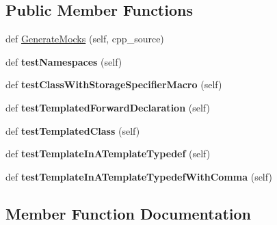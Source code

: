 \subsection*{Public Member Functions}
\begin{DoxyCompactItemize}
\item 
def \mbox{\hyperlink{classcpp_1_1gmock__class__test_1_1_generate_mocks_test_afdce6749dca14c1aa90762d389d92c87}{Generate\+Mocks}} (self, cpp\+\_\+source)
\item 
\mbox{\label{classcpp_1_1gmock__class__test_1_1_generate_mocks_test_a706812da9e8f79a689c707b4032db2d2}} 
def {\bfseries test\+Namespaces} (self)
\item 
\mbox{\label{classcpp_1_1gmock__class__test_1_1_generate_mocks_test_aba1ab8ae8a897ea9c22a47bcd1524254}} 
def {\bfseries test\+Class\+With\+Storage\+Specifier\+Macro} (self)
\item 
\mbox{\label{classcpp_1_1gmock__class__test_1_1_generate_mocks_test_a18cb0f03ecd4e54d0f787694c1513731}} 
def {\bfseries test\+Templated\+Forward\+Declaration} (self)
\item 
\mbox{\label{classcpp_1_1gmock__class__test_1_1_generate_mocks_test_a4098c99b66f0cbea7be9e66352a20f4d}} 
def {\bfseries test\+Templated\+Class} (self)
\item 
\mbox{\label{classcpp_1_1gmock__class__test_1_1_generate_mocks_test_a32a2840352d970c631d7be1b6d1970e6}} 
def {\bfseries test\+Template\+In\+A\+Template\+Typedef} (self)
\item 
\mbox{\label{classcpp_1_1gmock__class__test_1_1_generate_mocks_test_a67d1336b8782257fcfcdbda8c8d4f794}} 
def {\bfseries test\+Template\+In\+A\+Template\+Typedef\+With\+Comma} (self)
\end{DoxyCompactItemize}


\subsection{Member Function Documentation}
\mbox{\label{classcpp_1_1gmock__class__test_1_1_generate_mocks_test_afdce6749dca14c1aa90762d389d92c87}} 
